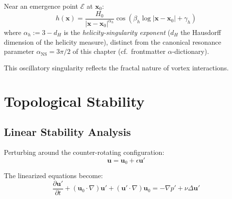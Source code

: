 \begin{proposition}\label{prop:helicity-sing}
Near an emergence point $\mathcal{E}$ at $\mathbf{x}_0$:
\begin{equation}
h(\mathbf{x}) = \frac{H_0}{|\mathbf{x} - \mathbf{x}_0|^{\alpha_h}} \cos(\beta_h \log|\mathbf{x} - \mathbf{x}_0| + \gamma_h)
\end{equation}
where $\alpha_h := 3 - d_H$ is the \emph{helicity-singularity exponent} ($d_H$ the Hausdorff dimension of the helicity measure), distinct from the canonical resonance parameter $\alpha_{\mathrm{NS}} = 3\pi/2$ of this chapter (cf.\ frontmatter $\alpha$-dictionary).
\end{proposition}

This oscillatory singularity reflects the fractal nature of vortex interactions\cite{ricca1992}.

\section{Topological Stability}

\subsection{Linear Stability Analysis}

Perturbing around the counter-rotating configuration:
\begin{equation}
\mathbf{u} = \mathbf{u}_0 + \epsilon \mathbf{u}'
\end{equation}

The linearized equations become:
\begin{equation}
\frac{\partial \mathbf{u}'}{\partial t} + (\mathbf{u}_0 \cdot \nabla)\mathbf{u}' + (\mathbf{u}' \cdot \nabla)\mathbf{u}_0 = -\nabla p' + \nu \Delta \mathbf{u}'
\end{equation}

